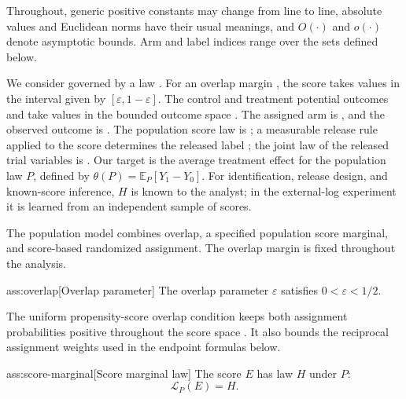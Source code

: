\documentclass[11pt]{article}
\begin{document}
Throughout, generic positive constants may change from line to line, absolute values and Euclidean norms have their usual meanings, and \(O(\cdot)\) and \(o(\cdot)\) denote asymptotic bounds. Arm and label indices range over the sets defined below.

We consider  governed by a law . For an overlap margin , the score  takes values in the interval  given by \([\varepsilon,1-\varepsilon]\). The control and treatment potential outcomes  and  take values in the bounded outcome space . The assigned arm is , and the observed outcome is . The population score law is ; a measurable release rule  applied to the score determines the released label ; the joint law of the released trial variables is . Our target is the average treatment effect  for the population law \(P\), defined by \(\theta(P)=\mathbb E_P[Y_1-Y_0]\). For identification, release design, and known-score inference, \(H\) is known to the analyst; in the external-log experiment it is learned from an independent sample of scores.




The population model combines overlap, a specified population score marginal, and score-based randomized assignment. The overlap margin is fixed throughout the analysis.

\begin{assumptionv}{ass:overlap}[Overlap parameter]
The overlap parameter \(\varepsilon\) satisfies \(0<\varepsilon<1/2\).
\end{assumptionv}

The uniform propensity-score overlap condition keeps both assignment probabilities positive throughout the score space \citep{FanShermanShum2014}. It also bounds the reciprocal assignment weights used in the endpoint formulas below.

\begin{assumptionv}{ass:score-marginal}[Score marginal law]
The score \(E\) has law \(H\) under \(P\):
\[
\mathcal L_P(E)=H.
\]
\end{assumptionv}
\end{document}
